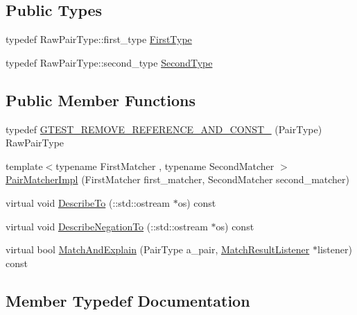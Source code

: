 \subsection*{Public Types}
\begin{DoxyCompactItemize}
\item 
typedef Raw\+Pair\+Type\+::first\+\_\+type \hyperlink{classtesting_1_1internal_1_1_pair_matcher_impl_a9de66d76f0ebb0f107a9c18903b03176}{First\+Type}
\item 
typedef Raw\+Pair\+Type\+::second\+\_\+type \hyperlink{classtesting_1_1internal_1_1_pair_matcher_impl_ad63c9ff4f1aff81562efca293ff5aca9}{Second\+Type}
\end{DoxyCompactItemize}
\subsection*{Public Member Functions}
\begin{DoxyCompactItemize}
\item 
typedef \hyperlink{classtesting_1_1internal_1_1_pair_matcher_impl_aa035224a7b73b2af1d1d27226a479241}{G\+T\+E\+S\+T\+\_\+\+R\+E\+M\+O\+V\+E\+\_\+\+R\+E\+F\+E\+R\+E\+N\+C\+E\+\_\+\+A\+N\+D\+\_\+\+C\+O\+N\+S\+T\+\_\+} (Pair\+Type) Raw\+Pair\+Type
\item 
{\footnotesize template$<$typename First\+Matcher , typename Second\+Matcher $>$ }\\\hyperlink{classtesting_1_1internal_1_1_pair_matcher_impl_ae2615e785df46255c8695a5972ca510a}{Pair\+Matcher\+Impl} (First\+Matcher first\+\_\+matcher, Second\+Matcher second\+\_\+matcher)
\item 
virtual void \hyperlink{classtesting_1_1internal_1_1_pair_matcher_impl_ad4b5139aa8a3cdcc178c9d81b98d95f0}{Describe\+To} (\+::std\+::ostream $\ast$os) const
\item 
virtual void \hyperlink{classtesting_1_1internal_1_1_pair_matcher_impl_a41ef8b1ae031cf342a380e2f2fb2a526}{Describe\+Negation\+To} (\+::std\+::ostream $\ast$os) const
\item 
virtual bool \hyperlink{classtesting_1_1internal_1_1_pair_matcher_impl_a1bba47f97cbf50a1f6331d3f7bfd47a1}{Match\+And\+Explain} (Pair\+Type a\+\_\+pair, \hyperlink{classtesting_1_1_match_result_listener}{Match\+Result\+Listener} $\ast$listener) const
\end{DoxyCompactItemize}


\subsection{Member Typedef Documentation}
\mbox{\label{classtesting_1_1internal_1_1_pair_matcher_impl_a9de66d76f0ebb0f107a9c18903b03176}} 
